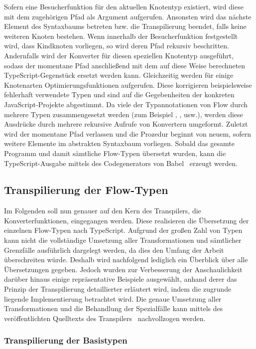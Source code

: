 Sofern eine Besucherfunktion für den aktuellen Knotentyp existiert, wird diese mit dem zugehörigen Pfad als Argument aufgerufen. Ansonsten wird das nächste Element des Syntaxbaums betreten bzw. die Transpilierung beendet, falls keine weiteren Knoten bestehen. Wenn innerhalb der Besucherfunktion festgestellt wird, dass Kindknoten vorliegen, so wird deren Pfad rekursiv beschritten. Andernfalls wird der Konverter für diesen speziellen Knotentyp ausgeführt, sodass der momentane Pfad anschließend mit dem auf diese Weise berechneten TypeScript-Gegenstück ersetzt werden kann. Gleichzeitig werden für einige Knotenarten Optimierungsfunktionen aufgerufen. Diese korrigieren beispielsweise fehlerhaft verwendete Typen und sind auf die Gegebenheiten der konkreten JavaScript-Projekte abgestimmt. Da viele der Typannotationen von Flow durch mehrere Typen zusammengesetzt werden (zum Beispiel , , usw.), werden diese Ausdrücke durch mehrere rekursive Aufrufe von Konvertern umgeformt. Zuletzt wird der momentane Pfad verlassen und die Prozedur beginnt von neuem, sofern weitere Elemente im abstrakten Syntaxbaum vorliegen. Sobald das gesamte Programm und damit sämtliche Flow-Typen übersetzt wurden, kann die TypeScript-Ausgabe mittels des Codegenerators von Babel~\autocite{BABEL:GENERATOR} erzeugt werden.

\subsection{Transpilierung der Flow-Typen}
\label{sec:flow-transpilation}

Im Folgenden soll nun genauer auf den Kern des Transpilers, die Konverterfunktionen, eingegangen werden. Diese realisieren die Übersetzung der einzelnen Flow-Typen nach TypeScript. Aufgrund der großen Zahl von Typen kann nicht die vollständige Umsetzung aller Transformationen und sämtlicher Grenzfälle ausführlich dargelegt werden, da dies den Umfang der Arbeit überschreiten würde. Deshalb wird nachfolgend lediglich ein Überblick über alle Übersetzungen gegeben. Jedoch wurden zur Verbesserung der Anschaulichkeit darüber hinaus einige repräsentative Beispiele ausgewählt, anhand derer das Prinzip der Transpilierung detaillierter erläutert wird, indem die zugrunde liegende Implementierung betrachtet wird. Die genaue Umsetzung aller Transformationen und die Behandlung der Spezialfälle kann mittels des veröffentlichten Quelltexts des Transpilers~\autocite{REFLOW_GITHUB} nachvollzogen werden.

\subsubsection{Transpilierung der Basistypen}

